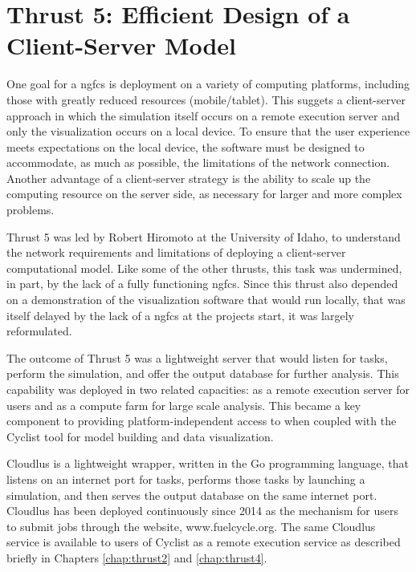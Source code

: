 \chapter{Thrust 5: Efficient Design of a Client-Server Model}\label{chap:thrust5}

One goal for a \gls{ngfcs} is deployment on a variety of computing platforms,
including those with greatly reduced resources (mobile/tablet).  This suggets
a client-server approach in which the simulation itself occurs on a remote
execution server and only the visualization occurs on a local device.  To
ensure that the user experience meets expectations on the local device, the
software must be designed to accommodate, as much as possible, the limitations
of the network connection.  Another advantage of a client-server strategy is
the ability to scale up the computing resource on the server side, as
necessary for larger and more complex problems.

Thrust 5 was led by Robert Hiromoto at the University of Idaho, to understand
the network requirements and limitations of deploying a client-server
computational model.  Like some of the other thrusts, this task was
undermined, in part, by the lack of a fully functioning \gls{ngfcs}.  Since
this thrust also depended on a demonstration of the visualization software
that would run locally, that was itself delayed by the lack of a \gls{ngfcs}
at the projects start, it was largely reformulated.

The outcome of Thrust 5 was a lightweight server that would listen for \Cyclus
tasks, perform the simulation, and offer the output database for further
analysis.  This capability was deployed in two related capacities: as a remote
execution server for \Cyclus users and as a compute farm for large scale
analysis.  This became a key component to providing platform-independent
access to \Cyclus when coupled with the Cyclist tool for model building and
data visualization.

Cloudlus is a lightweight wrapper, written in
the Go programming language, that listens on an internet port for tasks,
performs those tasks by launching a \Cyclus simulation, and then serves the
output database on the same internet port.  Cloudlus has been deployed
continuously since 2014 as the mechanism for users to submit \Cyclus jobs
through the website, www.fuelcycle.org.  The same Cloudlus service is
available to users of Cyclist as a remote execution service as described
briefly in Chapters \ref{chap:thrust2} and \ref{chap:thrust4}.

